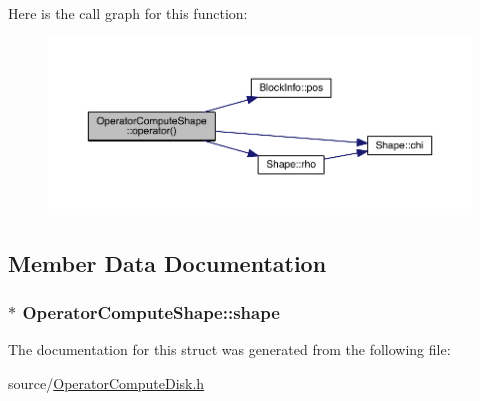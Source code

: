 Here is the call graph for this function\+:\nopagebreak
\begin{figure}[H]
\begin{center}
\leavevmode
\includegraphics[width=350pt]{de/d40/struct_operator_compute_shape_ad9d3edd854162a93b5c7212bd694e73a_cgraph}
\end{center}
\end{figure}




\subsection{Member Data Documentation}
\hypertarget{struct_operator_compute_shape_aed9a2a1e4b29d3fdc1d62ada8510d17b}{}
\subsubsection[{shape}]{$\ast$ Operator\+Compute\+Shape\+::shape}\label{struct_operator_compute_shape_aed9a2a1e4b29d3fdc1d62ada8510d17b}


The documentation for this struct was generated from the following file\+:\begin{DoxyCompactItemize}
\item 
source/\hyperlink{_operator_compute_disk_8h}{Operator\+Compute\+Disk.\+h}\end{DoxyCompactItemize}
